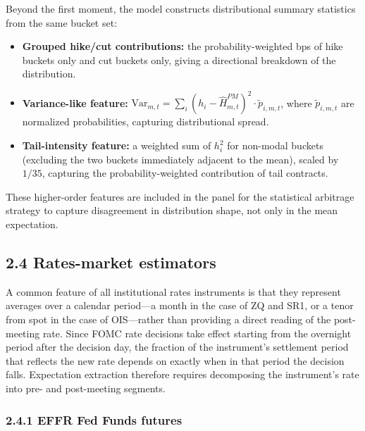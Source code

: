 Beyond the first moment, the model constructs distributional summary statistics from the same bucket set:
\begin{itemize}
    \item \textbf{Grouped hike/cut contributions:} the probability-weighted bps of hike buckets only and cut buckets only, giving a directional breakdown of the distribution.
    \item \textbf{Variance-like feature:} $\text{Var}_{m,t} = \sum_i (h_i - \widehat{H}^{PM}_{m,t})^2 \cdot \tilde{p}_{i,m,t}$, where $\tilde{p}_{i,m,t}$ are normalized probabilities, capturing distributional spread.
    \item \textbf{Tail-intensity feature:} a weighted sum of $h_i^2$ for non-modal buckets (excluding the two buckets immediately adjacent to the mean), scaled by $1/35$, capturing the probability-weighted contribution of tail contracts.
\end{itemize}
These higher-order features are included in the panel for the statistical arbitrage strategy to capture disagreement in distribution shape, not only in the mean expectation.

\subsection*{2.4 Rates-market estimators}

A common feature of all institutional rates instruments is that they represent averages over a calendar period---a month in the case of ZQ and SR1, or a tenor from spot in the case of OIS---rather than providing a direct reading of the post-meeting rate. Since FOMC rate decisions take effect starting from the overnight period after the decision day, the fraction of the instrument's settlement period that reflects the new rate depends on exactly when in that period the decision falls. Expectation extraction therefore requires decomposing the instrument's rate into pre- and post-meeting segments.

\subsubsection*{2.4.1 EFFR Fed Funds futures}

